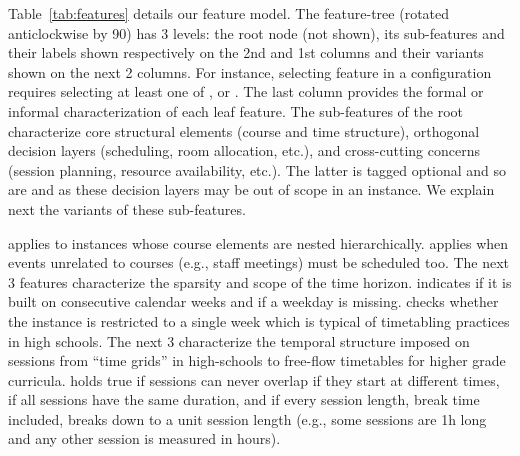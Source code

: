 \documentclass[runningheads]{llncs}
\begin{document}
Table~\ref{tab:features} details our feature model.
The feature-tree (rotated anticlockwise by 90\textdegree) has 3 levels:
the root node (not shown),
its sub-features and their labels
shown respectively on the 2nd and 1st columns 
and their variants shown on the next 2 columns.
For instance, selecting feature \hyperref[featmodel:hosting]{\hosting}
in a configuration requires selecting at least one of
\hyperref[featmodel:noroom]{\noroom}, 
\hyperref[featmodel:singleroom]{\singleroom} or
\hyperref[featmodel:multiroom]{\multiroom}.
The last column provides the formal or informal characterization of each leaf feature.
The sub-features of the root 
characterize core structural elements (course and time structure),
orthogonal decision layers (scheduling, room allocation, etc.),
and cross-cutting concerns (session planning, resource availability, etc.).
The latter is tagged optional
and so are
\hyperref[featmodel:hosting]{\hosting} and
\hyperref[featmodel:teaching]{\teaching}
as these decision layers may be out of scope in an instance.
We explain next the variants of these sub-features.

\hyperref[featmodel:hierarchy]{\coursehierarchy} applies to instances whose
course elements are nested hierarchically.
\hyperref[featmodel:event]{\event} applies when events unrelated to courses 
(e.g., staff meetings) must be scheduled too.
The next 3 features characterize the sparsity and scope of the time horizon.
\hyperref[featmodel:fullperiod]{\fullperiod} indicates if it is built on consecutive calendar weeks
and \hyperref[featmodel:fullweek]{\fullweek} if a weekday is missing. 
\hyperref[featmodel:singleweek]{\singleweek} checks whether the instance is restricted to a single week
which is typical of timetabling practices in high schools. The next 3 characterize the temporal structure imposed on sessions from ``time grids'' in high-schools
to free-flow timetables for higher grade curricula.
\hyperref[featmodel:nooverlap]{\nooverlap} holds true
if sessions can never overlap if they start at different times,
\hyperref[featmodel:sameduration]{\sameduration} if all sessions have the same duration,
and \hyperref[featmodel:synchronous]{\synchronous} if every session length, break time included, breaks down to a unit session length
(e.g., some sessions are 1h long and any other session is measured in hours).
\end{document}
